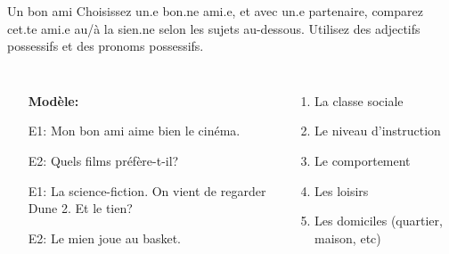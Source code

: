 \begin{frame}{Un bon ami}
  Choisissez un.e bon.ne ami.e, et avec un.e partenaire, comparez cet.te ami.e au/à la sien.ne selon les sujets au-dessous.
  Utilisez des adjectifs possessifs et des pronoms possessifs.
  \begin{columns}
      \begin{itemize}
        \item[] \textbf{Modèle:}
        \item[E1:] Mon bon ami aime bien le cinéma.
        \item[E2:] Quels films préfère-t-il?
        \item[E1:] La science-fiction. On vient de regarder Dune 2. Et le tien?
        \item[E2:] Le mien joue au basket.
      \end{itemize}
      \begin{enumerate}
        \item La classe sociale
        \item Le niveau d'instruction
        \item Le comportement
        \item Les loisirs
        \item Les domiciles (quartier, maison, etc)
      \end{enumerate}
  \end{columns}
\end{frame}